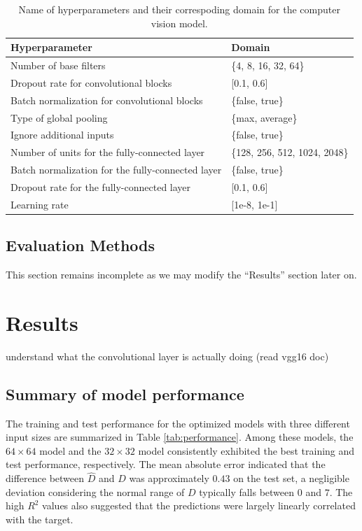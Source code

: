 \documentclass[]{interact}
\theoremstyle{plain}%
\theoremstyle{definition}
\theoremstyle{remark}
\begin{document}
\begin{table}

\caption{\label{tab:hyperparameter}Name of hyperparameters and their correspoding domain for the computer vision model.}
\centering
\begin{tabular}[t]{ll}
\toprule
Hyperparameter & Domain\\
\midrule
Number of base filters & \{4, 8, 16, 32, 64\}\\
Dropout rate for convolutional blocks & {}[0.1, 0.6]\\
Batch normalization for convolutional blocks & \{false, true\}\\
Type of global pooling & \{max, average\}\\
Ignore additional inputs & \{false, true\}\\
\addlinespace
Number of units for the fully-connected layer & \{128, 256, 512, 1024, 2048\}\\
Batch normalization for the fully-connected layer & \{false, true\}\\
Dropout rate for the fully-connected layer & {}[0.1, 0.6]\\
Learning rate & {}[1e-8, 1e-1]\\
\bottomrule
\end{tabular}
\end{table}

\subsection{Evaluation Methods}\label{evaluation-methods}

This section remains incomplete as we may modify the ``Results'' section
later on.

\section{Results}\label{results}

understand what the convolutional layer is actually doing (read vgg16
doc)

\subsection{Summary of model
performance}\label{summary-of-model-performance}

The training and test performance for the optimized models with three
different input sizes are summarized in Table \ref{tab:performance}.
Among these models, the \(64 \times 64\) model and the \(32 \times 32\)
model consistently exhibited the best training and test performance,
respectively. The mean absolute error indicated that the difference
between \(\hat{D}\) and \(D\) was approximately \(0.43\) on the test
set, a negligible deviation considering the normal range of \(D\)
typically falls between \(0\) and \(7\). The high \(R^2\) values also
suggested that the predictions were largely linearly correlated with the
target.
\end{document}
